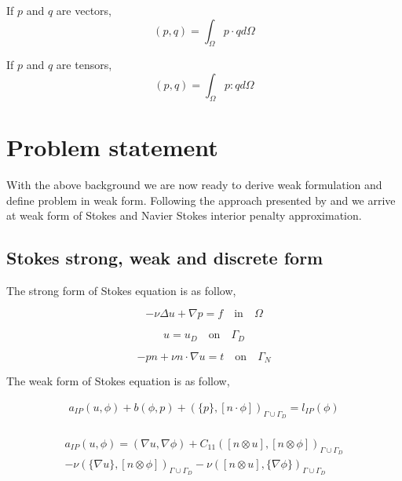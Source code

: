 \documentclass[a4paper,12pt]{book}
\begin{document}
If $p$ and $q$ are vectors,
\begin{equation}\label{Inner product vectors}
(p,q)=\int_{\Omega} p \cdot q d\Omega
\end{equation}

If $p$ and $q$ are tensors,
\begin{equation}\label{Inner product tensors}
(p,q)=\int_{\Omega} p:q d\Omega
\end{equation}

\section{Problem statement}

With the above background we are now ready to derive weak formulation and define problem in weak form. Following the approach presented by \cite{Montlaur} and \cite{Montlaur2} we arrive at weak form of Stokes and Navier Stokes interior penalty approximation.

\subsection{Stokes strong, weak and discrete form} \label{Stokes_flow_ch3}

The strong form of Stokes equation is as follow,

\begin{equation} \label{stokes_strong_form_ch3}
-\nu \Delta u + \nabla p = f \quad \textrm{in} \quad \Omega
\end{equation}

\begin{equation} \label{dirichlet condition stokes_ch3}
u = u_D \quad \textrm{on} \quad \Gamma_D
\end{equation}

\begin{equation} \label{neumann condition stokes_ch3}
-pn + \nu n \cdot \nabla u = t \quad \textrm{on} \quad \Gamma_N
\end{equation}

The weak form of Stokes equation is as follow,

\begin{equation}\label{stokes_weak_ch3}
\begin{split}
a_{IP}(u,\phi) + b(\phi,p) + (\{p\},[n\cdot \phi])_{\Gamma \cup \Gamma_D} = l_{IP}(\phi) 
\end{split}
\end{equation}
\\
\begin{equation}
\begin{split}
a_{IP}(u,\phi) = (\nabla u, \nabla \phi) + C_{11} ([n \otimes u],[n \otimes \phi])_{\Gamma \cup \Gamma_D} \\
- \nu (\{\nabla u\},[n \otimes \phi])_{\Gamma \cup \Gamma_D} - \nu ([n \otimes u],\{\nabla \phi\})_{\Gamma \cup \Gamma_D}
\end{split}
\end{equation}
\\
\end{document}
